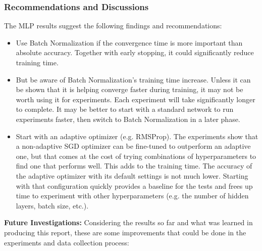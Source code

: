 \documentclass[../dropout-vs-batch-normalization.tex]{subfiles}
\begin{document}
\subsubsection{Recommendations and Discussions}
The MLP results suggest the following findings and recommendations:
\begin{itemize}
\item Use Batch Normalization if the convergence time is more important than absolute accuracy. Together with early stopping, it could significantly reduce training time.
\item But be aware of Batch Normalization's training time increase. Unless it can be shown that it is helping converge faster during training, it may not be worth using it for experiments. Each experiment will take significantly longer to complete. It may be better to start with a standard network to run experiments faster, then switch to Batch Normalization in a later phase.
\item Start with an adaptive optimizer (e.g. RMSProp). The experiments show that a non-adaptive SGD optimizer can be fine-tuned to outperform an adaptive one, but that comes at the cost of trying combinations of hyperparameters to find one that performs well. This adds to the training time. The accuracy of the adaptive optimizer with its default settings is not much lower. Starting with that configuration quickly provides a baseline for the tests and frees up time to experiment with other hyperparameters (e.g. the number of hidden layers, batch size, etc.). 
\end{itemize}


\medskip
\noindent\textbf{Future Investigations:} Considering the results so far and what was learned in producing this report, these are some improvements that could be done in the experiments and data collection process:
\end{document}

